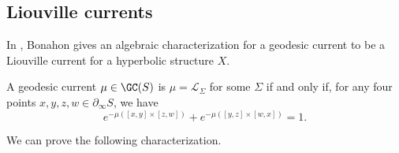 \subsection{Liouville currents}
\label{subsec:liouville}
In \cite[Theorem~13]{Bonahon88:GeodesicCurrent}, Bonahon gives an algebraic characterization for a geodesic current to be a Liouville current for a hyperbolic structure $X$.

\begin{theorem}
   A geodesic current $\mu \in \GC(S)$ is $\mu=\mathcal{L}_{\Sigma}$ for some $\Sigma$ if and only if, for any four points $x,y,z,w \in \partial_{\infty} S$, we have
   \[
      e^{-\mu([x,y]\times[z,w])} + e^{-\mu([y,z]\times [w,x])}=1.
   \]
   \label{thm:bonahonliouville}
\end{theorem}

We can prove the following characterization.

